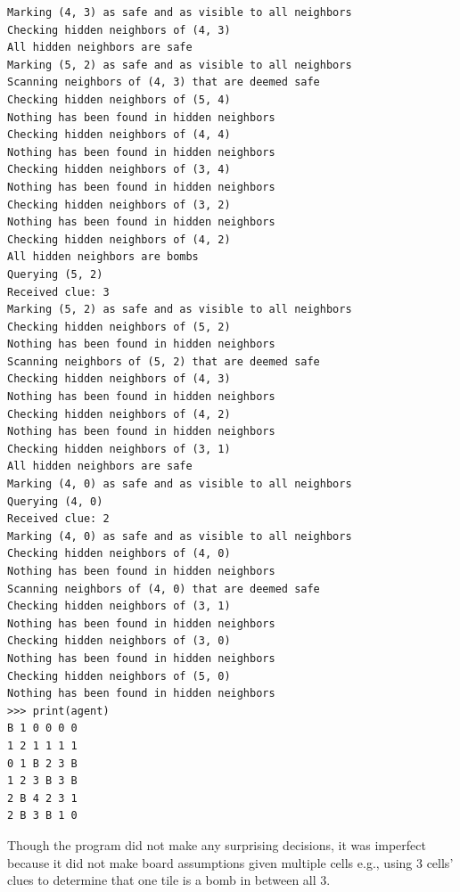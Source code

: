 \documentclass[13pt]{report}
\begin{document}
\begin{verbatim}
Marking (4, 3) as safe and as visible to all neighbors
Checking hidden neighbors of (4, 3)
All hidden neighbors are safe
Marking (5, 2) as safe and as visible to all neighbors
Scanning neighbors of (4, 3) that are deemed safe
Checking hidden neighbors of (5, 4)
Nothing has been found in hidden neighbors
Checking hidden neighbors of (4, 4)
Nothing has been found in hidden neighbors
Checking hidden neighbors of (3, 4)
Nothing has been found in hidden neighbors
Checking hidden neighbors of (3, 2)
Nothing has been found in hidden neighbors
Checking hidden neighbors of (4, 2)
All hidden neighbors are bombs
Querying (5, 2)
Received clue: 3
Marking (5, 2) as safe and as visible to all neighbors
Checking hidden neighbors of (5, 2)
Nothing has been found in hidden neighbors
Scanning neighbors of (5, 2) that are deemed safe
Checking hidden neighbors of (4, 3)
Nothing has been found in hidden neighbors
Checking hidden neighbors of (4, 2)
Nothing has been found in hidden neighbors
Checking hidden neighbors of (3, 1)
All hidden neighbors are safe
Marking (4, 0) as safe and as visible to all neighbors
Querying (4, 0)
Received clue: 2
Marking (4, 0) as safe and as visible to all neighbors
Checking hidden neighbors of (4, 0)
Nothing has been found in hidden neighbors
Scanning neighbors of (4, 0) that are deemed safe
Checking hidden neighbors of (3, 1)
Nothing has been found in hidden neighbors
Checking hidden neighbors of (3, 0)
Nothing has been found in hidden neighbors
Checking hidden neighbors of (5, 0)
Nothing has been found in hidden neighbors
>>> print(agent)
B 1 0 0 0 0 
1 2 1 1 1 1
0 1 B 2 3 B
1 2 3 B 3 B
2 B 4 2 3 1
2 B 3 B 1 0
\end{verbatim}
Though the program did not make any surprising decisions, it was imperfect because it did not make board assumptions given multiple cells e.g., using 3 cells' clues to determine that one tile is a bomb in between all 3.

\break
\end{document}
